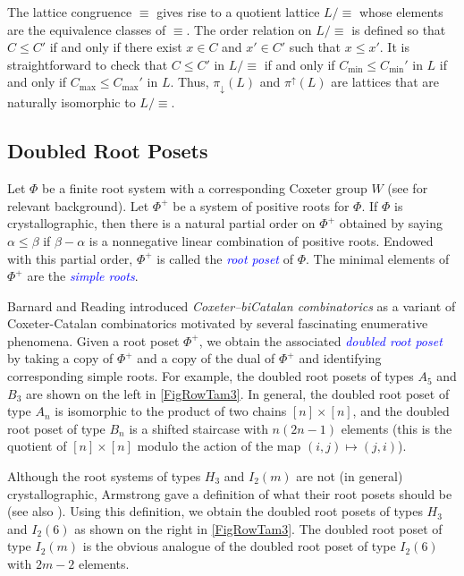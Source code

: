 \documentclass[11pt]{amsart}
\theoremstyle{definition}
\newcommand{\dfn}[1]{\textcolor{blue}{\emph{#1}}}
\begin{document}
The lattice congruence $\equiv$ gives rise to a quotient lattice $L/\equiv$ whose elements are the equivalence classes of $\equiv$. The order relation on $L/\equiv$ is defined so that $C\leq C'$ if and only if there exist $x\in C$ and $x'\in C'$ such that $x\leq x'$. It is straightforward to check that $C\leq C'$ in $L/\equiv$ if and only if $C_{\min}\leq C_{\min}'$ in $L$ if and only if $C_{\max}\leq C_{\max}'$ in $L$. Thus, $\pi_\downarrow(L)$ and $\pi^\uparrow(L)$ are lattices that are naturally isomorphic to $L/\equiv$. 



\subsection{Doubled Root Posets}

Let $\Phi$ be a finite root system with a corresponding Coxeter group $W$ (see \cite{BjornerBrenti,Humphreys} for relevant background). Let $\Phi^+$ be a system of positive roots for $\Phi$. If $\Phi$ is crystallographic, then there is a natural partial order on $\Phi^+$ obtained by saying $\alpha\leq\beta$ if $\beta-\alpha$ is a nonnegative linear combination of positive roots. Endowed with this partial order, $\Phi^+$ is called the \dfn{root poset} of $\Phi$. The minimal elements of $\Phi^+$ are the \dfn{simple roots}. 

Barnard and Reading \cite{BarnardReading} introduced \emph{Coxeter--biCatalan combinatorics} as a variant of Coxeter-Catalan combinatorics motivated by several fascinating enumerative phenomena. Given a  root poset $\Phi^+$, we obtain the associated \dfn{doubled root poset} by taking a copy of $\Phi^+$ and a copy of the dual of $\Phi^+$ and identifying corresponding simple roots. For example, the doubled root posets of types $A_5$ and $B_3$ are shown on the left in \cref{FigRowTam3}. In general, the doubled root poset of type $A_n$ is isomorphic to the product of two chains $[n]\times[n]$, and the doubled root poset of type $B_n$ is a shifted staircase with $n(2n-1)$ elements (this is the quotient of $[n]\times[n]$ modulo the action of the map $(i,j)\mapsto(j,i)$).  

Although the root systems of types $H_3$ and $I_2(m)$ are not (in general) crystallographic, Armstrong gave a definition of what their root posets should be \cite[Section~5.4.1]{Armstrong} (see also \cite{Cuntz}). Using this definition, we obtain the doubled root posets of types $H_3$ and $I_2(6)$ as shown on the right in \cref{FigRowTam3}. The doubled root poset of type $I_2(m)$ is the obvious analogue of the doubled root poset of type $I_2(6)$ with $2m-2$ elements. 
\end{document}
